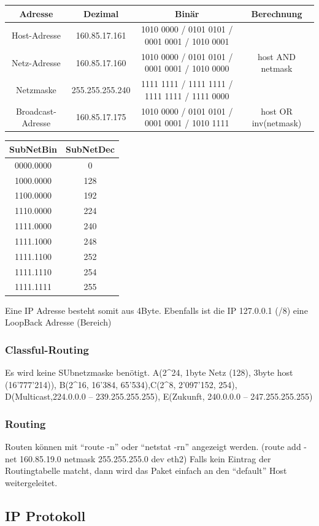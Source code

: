 \begin{tabular}{|c|c|c|c|}
\hline 
Adresse & Dezimal & Binär & Berechnung\tabularnewline
\hline 
\hline 
Host-Adresse & 160.85.17.161 & 1010 0000 / 0101 0101 / 0001 0001 / 1010 0001 & \tabularnewline
\hline 
Netz-Adresse & 160.85.17.160 & 1010 0000 / 0101 0101 / 0001 0001 / 1010 0000 & host AND netmask\tabularnewline
\hline 
Netzmaske & 255.255.255.240 & 1111 1111 / 1111 1111 / 1111 1111 / 1111 0000 & \tabularnewline
\hline 
Broadcast-Adresse & 160.85.17.175 & 1010 0000 / 0101 0101 / 0001 0001 / 1010 1111 & host OR inv(netmask)\tabularnewline
\hline 
\end{tabular}%
\begin{tabular}{|c|c|}
\hline 
SubNetBin & SubNetDec\tabularnewline
\hline 
\hline 
0000.0000 & 0\tabularnewline
\hline 
1000.0000 & 128\tabularnewline
\hline 
1100.0000 & 192\tabularnewline
\hline 
1110.0000 & 224\tabularnewline
\hline 
1111.0000 & 240\tabularnewline
\hline 
1111.1000 & 248\tabularnewline
\hline 
1111.1100 & 252\tabularnewline
\hline 
1111.1110 & 254\tabularnewline
\hline 
1111.1111 & 255\tabularnewline
\hline 
\end{tabular}

Eine IP Adresse besteht somit aus 4Byte. Ebenfalls ist die IP 127.0.0.1
(/8) eine LoopBack Adresse (Bereich)


\subsubsection*{Classful-Routing}

Es wird keine SUbnetzmaske benötigt. A(2\textasciicircum{}24, 1byte
Netz (128), 3byte host (16’777’214)), B(2\textasciicircum{}16, 16’384,
65’534),C(2\textasciicircum{}8, 2’097’152, 254), D(Multicast,224.0.0.0
– 239.255.255.255), E(Zukunft, 240.0.0.0 – 247.255.255.255)


\subsubsection*{Routing}

Routen können mit ``route -n'' oder ``netstat -rn'' angezeigt
werden. (route add -net 160.85.19.0 netmask 255.255.255.0 dev eth2)
Falls kein Eintrag der Routingtabelle matcht, dann wird das Paket
einfach an den ``default'' Host weitergeleitet.


\subsection*{IP Protokoll}

